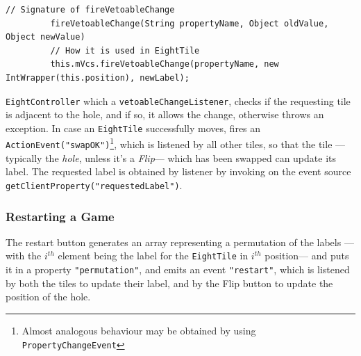    {
      \begin{lstlisting}[label=lst:fireVetoableChange,captionpos=b,caption={How \lstinline|fireVetoableChange| is used in \lstinline|EightTile|}]
         // Signature of fireVetoableChange
         fireVetoableChange(String propertyName, Object oldValue, Object newValue)
         // How it is used in EightTile
         this.mVcs.fireVetoableChange(propertyName, new IntWrapper(this.position), newLabel);
      \end{lstlisting}
   }

\lstinline|EightController| which a \lstinline|vetoableChangeListener|, checks if the requesting tile is adjacent to the hole, and if so, it allows the change, otherwise throws an exception.
In case an \lstinline|EightTile| successfully moves, fires an \lstinline|ActionEvent("swapOK")|\footnote{Almost analogous behaviour may be obtained by using \lstinline|PropertyChangeEvent|}, which is listened by all other tiles, so that the tile ---typically the \textit{hole}, unless it's a \textit{Flip}--- which has been swapped can update its label.
The requested label is obtained by listener by invoking on the event source \lstinline|getClientProperty("requestedLabel")|.

\subsubsection{Restarting a Game}
The restart button generates an array representing a permutation of the labels ---with the $i^{th}$ element being the label for the \lstinline|EightTile| in $i^{th}$ position--- and puts it in a property \lstinline|"permutation"|, and emits an event \lstinline|"restart"|, which is listened by both the tiles to update their label, and by the Flip button to update the position of the hole.

